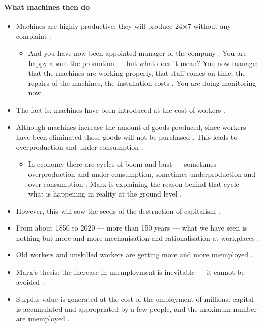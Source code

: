 \paragraph{What machines then do}
\begin{itemize}
    \item Machines are highly productive; they will produce 24$\times$7 without any complaint .
    \begin{itemize}
        \item And you have now been appointed manager of the company . You are happy about the promotion --- but what does it mean? You now manage: that the machines are working properly, that staff comes on time, the repairs of the machines, the installation costs . You are doing monitoring now .
    \end{itemize}
    \item The fact is: machines have been introduced at the cost of workers .
    \item Although machines increase the amount of goods produced, since workers have been eliminated those goods will not be purchased . This leads to overproduction and under-consumption .
    \begin{itemize}
        \item In economy there are cycles of boom and bust --- sometimes overproduction and under-consumption, sometimes underproduction and over-consumption . Marx is explaining the reason behind that cycle --- what is happening in reality at the ground level .
    \end{itemize}
    \item However, this will sow the seeds of the destruction of capitalism .
\end{itemize}

\begin{DataFact}
\begin{itemize}
    \item From about 1850 to 2020 --- more than 150 years --- what we have seen is nothing but more and more mechanisation and rationalisation at workplaces .
    \item Old workers and unskilled workers are getting more and more unemployed .
    \item Marx's thesis: the increase in unemployment is inevitable --- it cannot be avoided .
    \item Surplus value is generated at the cost of the employment of millions: capital is accumulated and appropriated by a few people, and the maximum number are unemployed .
\end{itemize}
\end{DataFact}

